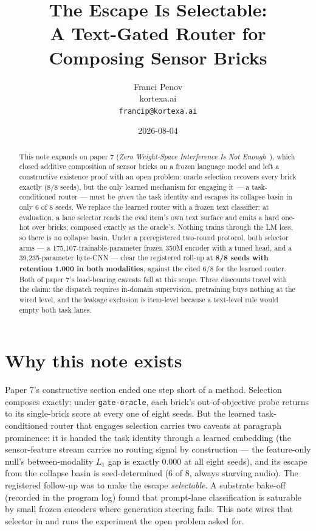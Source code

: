 \documentclass[11pt]{article}
\title{The Escape Is Selectable:\\A Text-Gated Router for Composing Sensor Bricks}
\author{Franci Penov \\ kortexa.ai \\ \texttt{francip@kortexa.ai}}
\date{2026-08-04}
\begin{document}
\maketitle

\begin{abstract}
This note expands on paper 7 (\emph{Zero Weight-Space Interference Is Not
Enough}~\cite{penov2026interference}), which closed additive composition of
sensor bricks on a frozen language model and left a constructive existence
proof with an open problem: oracle selection recovers every brick exactly
(8/8 seeds), but the only learned mechanism for engaging it --- a
task-conditioned router --- must be \emph{given} the task identity and
escapes its collapse basin in only 6 of 8 seeds. We replace the learned
router with a frozen text classifier: at evaluation, a lane selector reads
the eval item's own text surface and emits a hard one-hot over bricks,
composed exactly as the oracle's. Nothing trains through the LM loss, so
there is no collapse basin. Under a preregistered two-round protocol, both
selector arms --- a 175,107-trainable-parameter frozen 350M
encoder with a tuned head, and a 39,235-parameter byte-CNN ---
clear the registered roll-up at \textbf{8/8
seeds with retention 1.000 in both modalities}, against the cited
6/8 for the learned router. Both of paper 7's load-bearing
caveats fall at this scope. Three discounts travel with the claim: the
dispatch requires in-domain supervision, pretraining buys nothing at the
wired level, and the leakage exclusion is item-level because a text-level
rule would empty both task lanes.
\end{abstract}

\section{Why this note exists}

Paper 7's constructive section ended one step short of a method. Selection
composes exactly: under \texttt{gate-oracle}, each brick's out-of-objective
probe returns to its single-brick score at every one of eight seeds. But the
learned task-conditioned router that engages selection carries two caveats at
paragraph prominence: it is handed the task identity through a learned
embedding (the sensor-feature stream carries no routing signal by
construction --- the feature-only null's between-modality $L_1$ gap is
exactly $0.000$ at all eight seeds), and its escape from the collapse basin
is seed-determined (6 of 8, always starving audio). The
registered follow-up was to make the escape \emph{selectable}. A substrate
bake-off (recorded in the program log) found that prompt-lane classification
is saturable by small frozen encoders where generation steering fails.
This note wires that selector in and runs the experiment the open problem
asked for.
\end{document}
